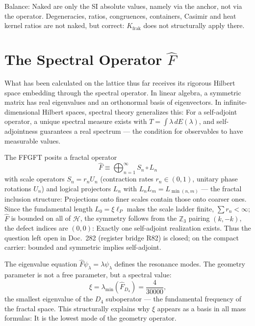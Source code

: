 Balance: Naked are only the SI absolute values, namely via the anchor,
not via the operator. Degeneracies, ratios, congruences,
containers, Casimir and heat kernel ratios are not naked, but
correct: $K_{\mathrm{frak}}$ does not structurally apply there.

\section{The Spectral Operator $\hat F$}

What has been calculated on the lattice thus far receives its rigorous
Hilbert space embedding through the spectral operator. In linear
algebra, a symmetric matrix has real eigenvalues and an
orthonormal basis of eigenvectors. In infinite-dimensional
Hilbert spaces, spectral theory generalizes this: For a
self-adjoint operator, a unique spectral measure exists with
$T = \int\lambda\,dE(\lambda)$, and self-adjointness guarantees
a real spectrum --- the condition for observables to have measurable
values.

The FFGFT posits a fractal operator
\begin{equation}
  \hat F\equiv\bigoplus_{n=1}^\infty S_n\circ L_n
\end{equation}
with scale operators $S_n = r_nU_n$ (contraction rates $r_n\in(0,1)$,
unitary phase rotations $U_n$) and logical projectors $L_n$ with
$L_nL_m = L_{\min(n,m)}$ --- the fractal inclusion structure: Projections
onto finer scales contain those onto coarser ones. Since the
fundamental length $L_0 = \xi\ell_P$ makes the scale ladder finite,
$\sum r_n<\infty$; $\hat F$ is bounded on all of $\mathcal{H}$, the
symmetry follows from the $\mathbb{Z}_3$ pairing $(k,-k)$, the defect indices
are $(0,0)$: Exactly one self-adjoint
realization exists. Thus the question left open in Doc.~282
(register bridge R82) is closed; on the compact carrier:
bounded and symmetric implies self-adjoint.

The eigenvalue equation $\hat F\psi_\lambda = \lambda\psi_\lambda$
defines the resonance modes. The geometry parameter is not a free
parameter, but a spectral value:
\begin{equation}
  \xi = \lambda_{\min}(\hat F_{D_4}) = \frac{4}{30000},
\end{equation}
the smallest eigenvalue of the $D_4$ suboperator --- the fundamental
frequency of the fractal space. This structurally explains why $\xi$ appears as a basis in all mass formulas: It is the lowest mode of the geometry
operator.


